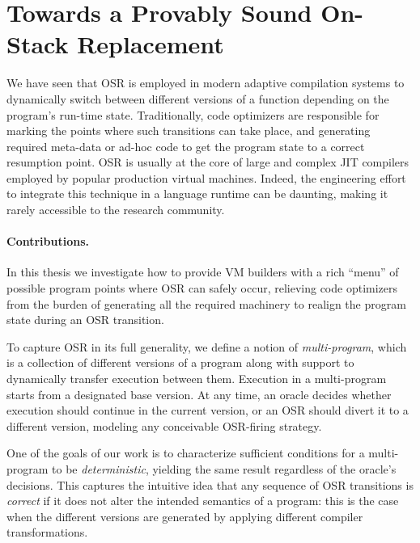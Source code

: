 
\section{Towards a Provably Sound On-Stack Replacement}
\label{se:osr-a-la-carte}

We have seen that OSR is employed in modern adaptive compilation systems to dynamically switch between different versions of a function depending on the program's run-time state. Traditionally, code optimizers are responsible for marking the points where such transitions can take place, and generating required meta-data or ad-hoc code to get the program state to a correct resumption point. OSR is usually at the core of large and complex JIT compilers employed by popular production virtual machines. Indeed, the engineering effort to integrate this technique in a language runtime can be daunting, making it rarely accessible to the research community.

\paragraph*{Contributions.} In this thesis we investigate how to provide VM builders with a rich ``menu'' of possible program points where OSR can safely occur, relieving code optimizers from the burden of generating all the required machinery to realign the program state during an OSR transition.

To capture OSR in its full generality, we define a notion of {\em multi-program}, which is a collection of different versions of a program along with support to dynamically transfer execution between them. Execution in a multi-program starts from a designated base version. At any time, an oracle decides whether execution should continue in the current version, or an OSR should divert it to a different version, modeling any conceivable OSR-firing strategy.

One of the goals of our work is to characterize sufficient conditions for a multi-program to be {\em deterministic}, yielding the same result regardless of the oracle's decisions. This captures the intuitive idea that any sequence of OSR transitions is {\em correct} if it does not alter the intended semantics of a program: this is the case when the different versions are generated by applying different compiler transformations.

